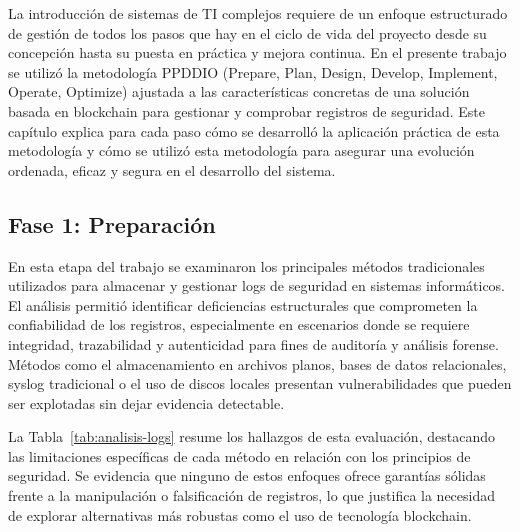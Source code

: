 La introducción de sistemas de TI complejos requiere de un enfoque estructurado de gestión de todos los pasos que hay en el ciclo de vida del proyecto desde su concepción hasta su puesta en práctica y mejora continua. En el presente trabajo se utilizó la metodología PPDDIO (Prepare, Plan, Design, Develop, Implement, Operate, Optimize) ajustada a las características concretas de una solución basada en blockchain para gestionar y comprobar registros de seguridad. Este capítulo explica para cada paso cómo se desarrolló la aplicación práctica de esta metodología y cómo se utilizó esta metodología para asegurar una evolución ordenada, eficaz y segura en el desarrollo del sistema.


\subsection{Fase 1: Preparación}
En esta etapa del trabajo se examinaron los principales métodos tradicionales utilizados para almacenar y gestionar logs de seguridad en sistemas informáticos. El análisis permitió identificar deficiencias estructurales que comprometen la confiabilidad de los registros, especialmente en escenarios donde se requiere integridad, trazabilidad y autenticidad para fines de auditoría y análisis forense. Métodos como el almacenamiento en archivos planos, bases de datos relacionales, syslog tradicional o el uso de discos locales presentan vulnerabilidades que pueden ser explotadas sin dejar evidencia detectable.

La Tabla~\ref{tab:analisis-logs} resume los hallazgos de esta evaluación, destacando las limitaciones específicas de cada método en relación con los principios de seguridad. Se evidencia que ninguno de estos enfoques ofrece garantías sólidas frente a la manipulación o falsificación de registros, lo que justifica la necesidad de explorar alternativas más robustas como el uso de tecnología blockchain.
\\
\\
\\
\\
\\
\\
\\

